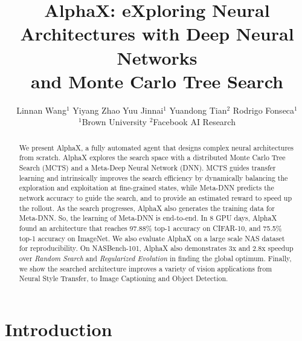 \documentclass[10pt,twocolumn,letterpaper]{article}
\renewcommand{\thefootnote}{*}
\begin{document}
\newcommand{\Commentl}[1]{ {\hfill $\triangleright$ \it #1}}
\newcommand{\Comment}[1]{ {\begin{flushright} $\triangleright$ \it #1 \end{flushright}}}

\title{ \vspace{-0.2in} AlphaX: eXploring Neural Architectures with Deep Neural Networks \\ and Monte Carlo Tree Search \vspace{-0.2in}}


\author{Linnan Wang$^1$ \quad Yiyang Zhao \quad Yuu Jinnai$^1$  \quad Yuandong Tian$^2$ \quad Rodrigo Fonseca$^1$ \\
$^1$Brown University \quad $^2$Facebook AI Research}



\maketitle
\renewcommand{\thefootnote}{\arabic{footnote}}


\begin{abstract}
We present AlphaX, a fully automated agent that designs complex neural architectures from scratch.
AlphaX explores the search space with a distributed Monte Carlo Tree Search (MCTS) and a Meta-Deep Neural Network (DNN). MCTS guides transfer learning and intrinsically improves the search efficiency by dynamically balancing the exploration and exploitation at fine-grained states, while Meta-DNN predicts the network accuracy to guide the search, and to provide an estimated reward to speed up the rollout. As the search progresses, AlphaX also generates the training data for Meta-DNN. So, the learning of Meta-DNN is end-to-end. In 8 GPU days, AlphaX found an architecture that reaches 97.88\% top-1 accuracy on CIFAR-10, and 75.5\% top-1 accuracy on ImageNet. We also evaluate AlphaX on a large scale NAS dataset for reproducibility. On NASBench-101, AlphaX also demonstrates 3x and 2.8x speedup over \textit{Random Search} and \textit{Regularized Evolution} in finding the global optimum. Finally, we show the searched architecture improves a variety of vision applications from Neural Style Transfer, to Image Captioning and Object Detection.
\end{abstract}

\section{Introduction}
\end{document}
